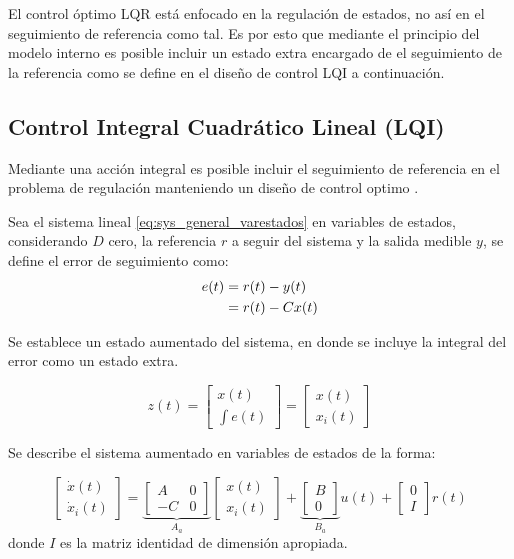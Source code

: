 El control óptimo LQR está enfocado en la regulación de estados, no así en el seguimiento de referencia como tal. Es por esto que mediante el principio del modelo interno es posible incluir un estado extra encargado de el seguimiento de la referencia como se define en el diseño de control LQI a continuación.

\subsection{Control Integral Cuadrático Lineal (LQI)}

Mediante una acción integral es posible incluir el seguimiento de referencia en el problema de regulación manteniendo un diseño de control optimo \cite{feng2007lqi}.

Sea el sistema lineal \eqref{eq:sys_general_varestados} en variables de estados, considerando $D$ cero, la referencia $r$ a seguir del sistema y la salida medible $y$, se define el error de seguimiento como:
\begin{align}
    e(t) & = r(t) - y(t) \notag \\
    & = r(t) - C x(t)
\end{align}

Se establece un estado aumentado del sistema, en donde se incluye la integral del error como un estado extra.

\begin{equation}
    z(t) = \begin{bmatrix}
        x(t) \\ \int e(t)
    \end{bmatrix} 
    = \begin{bmatrix}
        x(t) \\ x_i(t)
    \end{bmatrix}
\end{equation}

Se describe el sistema aumentado en variables de estados de la forma:

\begin{equation}
    \begin{bmatrix}
        \dot{x}(t) \\ \dot{x}_i(t)
    \end{bmatrix} = \underbrace{\begin{bmatrix}
        A & 0 \\ -C & 0 
    \end{bmatrix}}_{A_a} \begin{bmatrix}
        x(t) \\ x_i(t)
    \end{bmatrix} + \underbrace{\begin{bmatrix}
        B \\ 0
    \end{bmatrix}}_{B_a} u(t) + \begin{bmatrix}
        0 \\ I
    \end{bmatrix} r(t)
\end{equation}
donde $I$ es la matriz identidad de dimensión apropiada. 

